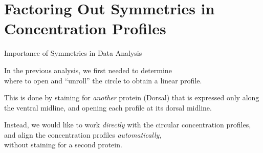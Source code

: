 \section[Factoring Out Symmetries in Concentration Profiles]{Factoring Out Symmetries in Concentration Profiles}

\begin{frame}{Importance of Symmetries in Data Analysis}

	\centering
	In the previous analysis, we first needed to determine \\where to open and ``unroll'' the circle to obtain a linear profile.
	
	\centering
	
	This is done by staining for {\em another} protein (Dorsal) that is expressed only along the ventral midline, and opening each profile at its dorsal midline. 
	
	\vspace{0.2in}
	
	Instead, we would like to work {\em directly} with the circular concentration profiles, \\ and align the concentration profiles {\em automatically}, \\without staining for a second protein. 

\end{frame}

